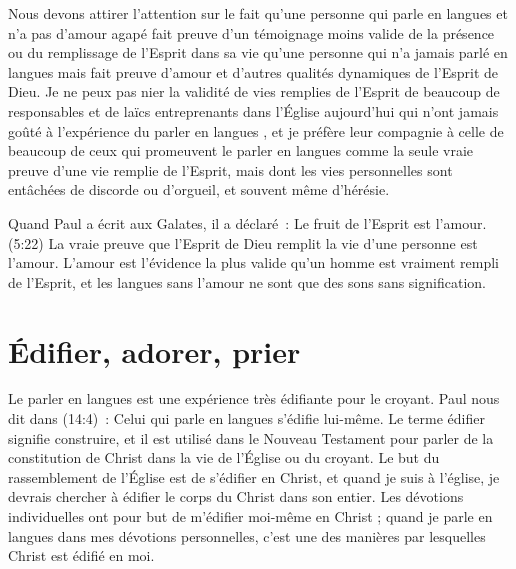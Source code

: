 Nous devons attirer l'attention sur le fait qu'une personne qui parle
 en langues et n'a pas d'amour agapé fait preuve d'un témoignage
 moins valide de la présence ou du remplissage de l'Esprit dans sa vie
 qu'une personne qui n'a jamais parlé en langues mais fait preuve d'amour
 et d'autres qualités dynamiques de l'Esprit de Dieu.
 Je ne peux pas nier la validité de vies remplies de l'Esprit de beaucoup
 de responsables et de laïcs entreprenants dans l'Église aujourd'hui
 qui n'ont jamais goûté à l'expérience 
 du parler en langues ,
 et je préfère leur compagnie à celle de beaucoup de ceux qui promeuvent
 le parler en langues comme la seule vraie preuve d'une vie remplie
 de l'Esprit, mais dont les vies personnelles sont entâchées de discorde
 ou d'orgueil, et souvent même d'hérésie.

Quand Paul a écrit aux Galates, il a déclaré~:
 \og Le fruit de l'Esprit est l'amour. \fg{}(5:22)
 La vraie preuve que l'Esprit de Dieu remplit la vie d'une personne
 est l'amour. L'amour est l'évidence la plus valide qu'un homme
 est vraiment rempli de l'Esprit, et les langues sans l'amour
 ne sont que des sons sans signification.


\section{\'Edifier, adorer, prier}

Le parler en langues est une expérience 
 très édifiante pour le croyant.
 Paul nous dit dans (14:4)~:
 \og Celui qui parle en langues s'édifie lui-même. \fg{}
 Le terme \og édifier \fg{} signifie construire, et il est utilisé
 dans le Nouveau Testament pour parler de la constitution de Christ
 dans la vie de l'Église ou du croyant. Le but du rassemblement de l'Église
 est de s'édifier en Christ, et quand je suis à l'église,
 je devrais chercher à édifier le corps du Christ dans son entier.
 Les dévotions individuelles ont pour but de m'édifier moi-même en Christ ;
 quand je parle en langues dans mes dévotions personnelles,
 c'est une des manières par lesquelles Christ est édifié en moi.

